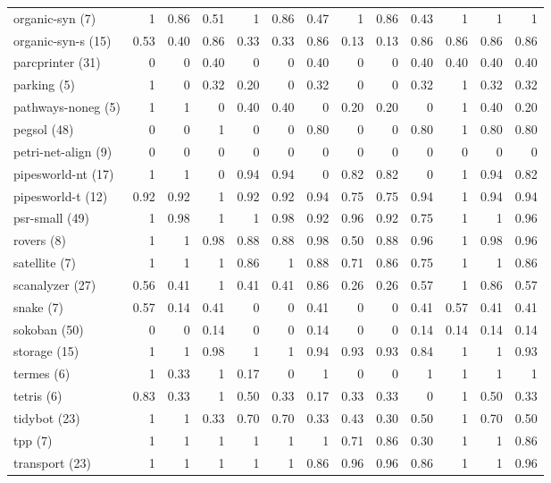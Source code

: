 \begin{tabular}{l|rrr|rrr|rrr|rrr}
		organic-syn (7) & 1 & 0.86 & 0.51 & 1 & 0.86 & 0.47 & 1 & 0.86 & 0.43 & 1 & 1 & 1\\
		organic-syn-s (15) & 0.53 & 0.40 & 0.86 & 0.33 & 0.33 & 0.86 & 0.13 & 0.13 & 0.86 & 0.86 & 0.86 & 0.86\\
		parcprinter (31) & 0 & 0 & 0.40 & 0 & 0 & 0.40 & 0 & 0 & 0.40 & 0.40 & 0.40 & 0.40\\
		parking (5) & 1 & 0 & 0.32 & 0.20 & 0 & 0.32 & 0 & 0 & 0.32 & 1 & 0.32 & 0.32\\
		pathways-noneg (5) & 1 & 1 & 0 & 0.40 & 0.40 & 0 & 0.20 & 0.20 & 0 & 1 & 0.40 & 0.20\\
		pegsol (48) & 0 & 0 & 1 & 0 & 0 & 0.80 & 0 & 0 & 0.80 & 1 & 0.80 & 0.80\\
		petri-net-align (9) & 0 & 0 & 0 & 0 & 0 & 0 & 0 & 0 & 0 & 0 & 0 & 0\\
		pipesworld-nt (17) & 1 & 1 & 0 & 0.94 & 0.94 & 0 & 0.82 & 0.82 & 0 & 1 & 0.94 & 0.82\\
		pipesworld-t (12) & 0.92 & 0.92 & 1 & 0.92 & 0.92 & 0.94 & 0.75 & 0.75 & 0.94 & 1 & 0.94 & 0.94\\
		psr-small (49) & 1 & 0.98 & 1 & 1 & 0.98 & 0.92 & 0.96 & 0.92 & 0.75 & 1 & 1 & 0.96\\
		rovers (8) & 1 & 1 & 0.98 & 0.88 & 0.88 & 0.98 & 0.50 & 0.88 & 0.96 & 1 & 0.98 & 0.96\\
		satellite (7) & 1 & 1 & 1 & 0.86 & 1 & 0.88 & 0.71 & 0.86 & 0.75 & 1 & 1 & 0.86\\
		scanalyzer (27) & 0.56 & 0.41 & 1 & 0.41 & 0.41 & 0.86 & 0.26 & 0.26 & 0.57 & 1 & 0.86 & 0.57\\
		snake (7) & 0.57 & 0.14 & 0.41 & 0 & 0 & 0.41 & 0 & 0 & 0.41 & 0.57 & 0.41 & 0.41\\
		sokoban (50) & 0 & 0 & 0.14 & 0 & 0 & 0.14 & 0 & 0 & 0.14 & 0.14 & 0.14 & 0.14\\
		storage (15) & 1 & 1 & 0.98 & 1 & 1 & 0.94 & 0.93 & 0.93 & 0.84 & 1 & 1 & 0.93\\
		termes (6) & 1 & 0.33 & 1 & 0.17 & 0 & 1 & 0 & 0 & 1 & 1 & 1 & 1\\
		tetris (6) & 0.83 & 0.33 & 1 & 0.50 & 0.33 & 0.17 & 0.33 & 0.33 & 0 & 1 & 0.50 & 0.33\\
		tidybot (23) & 1 & 1 & 0.33 & 0.70 & 0.70 & 0.33 & 0.43 & 0.30 & 0.50 & 1 & 0.70 & 0.50\\
		tpp (7) & 1 & 1 & 1 & 1 & 1 & 1 & 0.71 & 0.86 & 0.30 & 1 & 1 & 0.86\\
		transport (23) & 1 & 1 & 1 & 1 & 1 & 0.86 & 0.96 & 0.96 & 0.86 & 1 & 1 & 0.96\\

\end{tabular}
